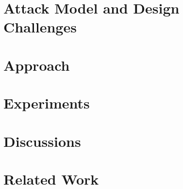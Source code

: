 \section{Attack Model and Design Challenges}


\section{Approach}


\section{Experiments}


 \section{Discussions}
 

\section{Related Work}








